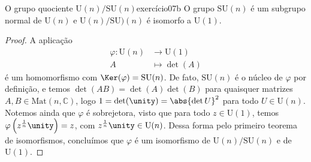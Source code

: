 \begin{proposition}{O grupo quociente \(\mathrm{U}(n)/\mathrm{SU}(n)\)}{exercício07b}
    O grupo \(\mathrm{SU}(n)\) é um subgrupo normal de \(\mathrm{U}(n)\) e \(\mathrm{U}(n)/\mathrm{SU})(n)\) é isomorfo a \(\mathrm{U}(1)\).
\end{proposition}
\begin{proof}
    A aplicação
    \begin{align*}
        \varphi : \mathrm{U}(n) &\to \mathrm{U}(1)\\
                              A &\mapsto \det(A)
    \end{align*}
    é um homomorfismo com \(\Ker(\varphi) = \mathrm{SU}(n)\). De fato, \(\mathrm{SU}(n)\) é o núcleo de \(\varphi\) por definição, e temos \(\det(AB)=\det(A)\det(B)\) para quaisquer matrizes \(A,B \in \mathrm{Mat}(n,\mathbb{C})\), logo \(1 = \det(\unity) = \abs{\det{U}}^2\) para todo \(U \in \mathrm{U}(n)\). Notemos ainda que \(\varphi\) é sobrejetora, visto que para todo \(z \in \mathrm{U}(1)\), temos \(\varphi\left(z^{\frac1n}\unity\right) = z\), com \(z^{\frac1n}\unity \in \mathrm{U}(n)\). Dessa forma pelo primeiro teorema de isomorfismos, concluímos que \(\varphi\) é um isomorfismo de \(\mathrm{U}(n)/\mathrm{SU}(n)\) e de \(\mathrm{U}(1)\).
\end{proof}

